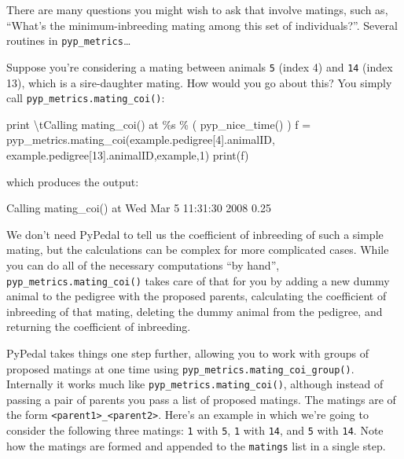 \documentclass[
  letterpaper,
  DIV=11,
  numbers=noendperiod]{scrreprt}
\newenvironment{Shaded}{\begin{snugshade}}{\end{snugshade}}
\newcommand{\BuiltInTok}[1]{\textcolor[rgb]{0.00,0.23,0.31}{#1}}
\newcommand{\CharTok}[1]{\textcolor[rgb]{0.13,0.47,0.30}{#1}}
\newcommand{\DecValTok}[1]{\textcolor[rgb]{0.68,0.00,0.00}{#1}}
\newcommand{\FloatTok}[1]{\textcolor[rgb]{0.68,0.00,0.00}{#1}}
\newcommand{\NormalTok}[1]{\textcolor[rgb]{0.00,0.23,0.31}{#1}}
\newcommand{\OperatorTok}[1]{\textcolor[rgb]{0.37,0.37,0.37}{#1}}
\newcommand{\SpecialCharTok}[1]{\textcolor[rgb]{0.37,0.37,0.37}{#1}}
\newcommand{\StringTok}[1]{\textcolor[rgb]{0.13,0.47,0.30}{#1}}
\begin{document}
There are many questions you might wish to ask that involve matings,
such as, ``What's the minimum-inbreeding mating among this set of
individuals?''. Several routines in \texttt{pyp\_metrics}\ldots{}

Suppose you're considering a mating between animals \texttt{5} (index 4)
and \texttt{14} (index 13), which is a sire-daughter mating. How would
you go about this? You simply call \texttt{pyp\_metrics.mating\_coi()}:

\begin{Shaded}
\begin{Highlighting}[]
\BuiltInTok{print} \StringTok{\textquotesingle{}}\CharTok{\textbackslash{}t}\StringTok{Calling mating\_coi() at }\SpecialCharTok{\%s}\StringTok{\textquotesingle{}} \OperatorTok{\%}\NormalTok{ ( pyp\_nice\_time() )}
\NormalTok{f }\OperatorTok{=}\NormalTok{ pyp\_metrics.mating\_coi(example.pedigree[}\DecValTok{4}\NormalTok{].animalID,}
\NormalTok{    example.pedigree[}\DecValTok{13}\NormalTok{].animalID,example,}\DecValTok{1}\NormalTok{)}
\BuiltInTok{print}\NormalTok{(f)}
\end{Highlighting}
\end{Shaded}

which produces the output:

\begin{Shaded}
\begin{Highlighting}[]
\NormalTok{Calling mating\_coi() at Wed Mar  }\DecValTok{5} \DecValTok{11}\NormalTok{:}\DecValTok{31}\NormalTok{:}\DecValTok{30} \DecValTok{2008}
\FloatTok{0.25}
\end{Highlighting}
\end{Shaded}

We don't need PyPedal to tell us the coefficient of inbreeding of such a
simple mating, but the calculations can be complex for more complicated
cases. While you can do all of the necessary computations ``by hand'',
\texttt{pyp\_metrics.mating\_coi()} takes care of that for you by adding
a new dummy animal to the pedigree with the proposed parents,
calculating the coefficient of inbreeding of that mating, deleting the
dummy animal from the pedigree, and returning the coefficient of
inbreeding.

PyPedal takes things one step further, allowing you to work with groups
of proposed matings at one time using
\texttt{pyp\_metrics.mating\_coi\_group()}. Internally it works much
like \texttt{pyp\_metrics.mating\_coi()}, although instead of passing a
pair of parents you pass a list of proposed matings. The matings are of
the form
\texttt{\textless{}parent1\textgreater{}\_\textless{}parent2\textgreater{}}.
Here's an example in which we're going to consider the following three
matings: \texttt{1} with \texttt{5}, \texttt{1} with \texttt{14}, and
\texttt{5} with \texttt{14}. Note how the matings are formed and
appended to the \texttt{matings} list in a single step.
\end{document}
